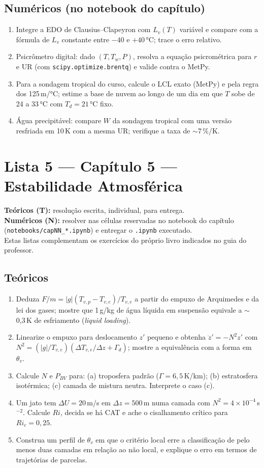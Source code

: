 \documentclass[11pt]{article}
\newcommand{\instrucoes}{%
\begin{caixalista}
\textbf{Teóricos (T):} resolução escrita, individual, para entrega.\\
\textbf{Numéricos (N):} resolver nas células reservadas no notebook do
capítulo (\texttt{notebooks/capNN\_*.ipynb}) e entregar o
\texttt{.ipynb} executado.\\
Estas listas complementam os exercícios do próprio livro indicados no
guia do professor.
\end{caixalista}}
\begin{document}
\subsection*{Numéricos (no notebook do capítulo)}

\begin{enumerate}[label=\textbf{N\arabic*.},itemsep=4pt]
  \item Integre a EDO de Clausius--Clapeyron com $L_v(T)$ variável e
        compare com a fórmula de $L_v$ constante entre $-40$ e $+40\,°$C;
        trace o erro relativo.
  \item Psicrômetro digital: dado $(T, T_w, P)$, resolva a equação
        psicrométrica para $r$ e UR (com \texttt{scipy.optimize.brentq}) e
        valide contra o MetPy.
  \item Para a sondagem tropical do curso, calcule o LCL exato (MetPy) e
        pela regra dos 125\,m/°C; estime a base de nuvem ao longo de um dia
        em que $T$ sobe de 24 a 33\,°C com $T_d = 21\,°$C fixo.
  \item Água precipitável: compare $W$ da sondagem tropical com uma versão
        resfriada em 10\,K com a mesma UR; verifique a taxa de
        $\sim$7\,\%/K.
\end{enumerate}

\clearpage
\section*{Lista 5 --- Capítulo 5 --- Estabilidade Atmosférica}
\instrucoes

\subsection*{Teóricos}

\begin{enumerate}[label=\textbf{T\arabic*.},itemsep=4pt]
  \item Deduza $F/m = |g|(T_{v,p}-T_{v,e})/T_{v,e}$ a partir do empuxo de
        Arquimedes e da lei dos gases; mostre que 1\,g/kg de água líquida
        em suspensão equivale a $\sim$0{,}3\,K de esfriamento
        (\emph{liquid loading}).
  \item Linearize o empuxo para deslocamento $z'$ pequeno e obtenha
        $\ddot z' = -N^2 z'$ com
        $N^2 = (|g|/T_{v,e})(\Delta T_{v,e}/\Delta z + \Gamma_d)$; mostre
        a equivalência com a forma em $\theta_v$.
  \item Calcule $N$ e $P_{BV}$ para: (a) troposfera padrão
        ($\Gamma = 6{,}5$\,K/km); (b) estratosfera isotérmica; (c) camada
        de mistura neutra. Interprete o caso (c).
  \item Um jato tem $\Delta U = 20$\,m/s em $\Delta z = 500$\,m numa
        camada com $N^2 = 4\times10^{-4}$\,s$^{-2}$. Calcule $Ri$, decida
        se há CAT e ache o cisalhamento crítico para $Ri_c = 0{,}25$.
  \item Construa um perfil de $\theta_v$ em que o critério local erre a
        classificação de pelo menos duas camadas em relação ao não local,
        e explique o erro em termos de trajetórias de parcelas.
\end{enumerate}
\end{document}
